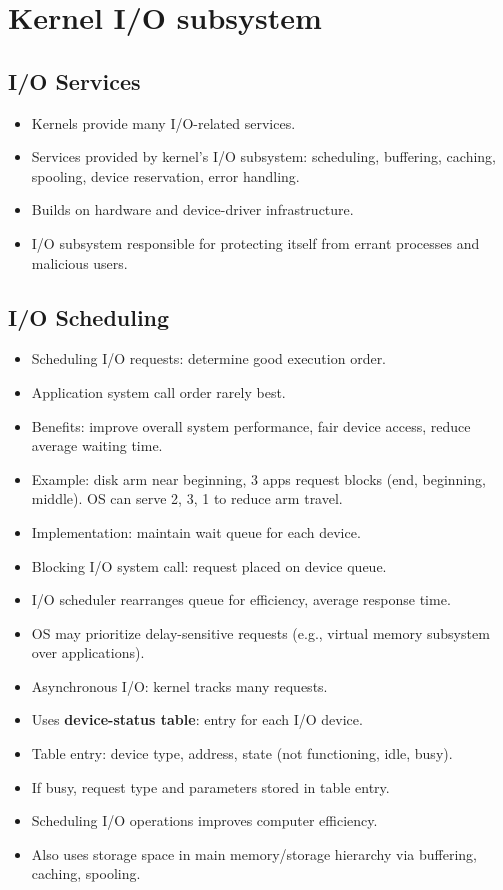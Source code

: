 \section{Kernel I/O subsystem}

\subsection{I/O Services}
\begin{itemize}
    \item Kernels provide many I/O-related services.
    \item Services provided by kernel's I/O subsystem: scheduling, buffering, caching, spooling, device reservation, error handling.
    \item Builds on hardware and device-driver infrastructure.
    \item I/O subsystem responsible for protecting itself from errant processes and malicious users.
\end{itemize}

\subsection{I/O Scheduling}
\begin{itemize}
    \item Scheduling I/O requests: determine good execution order.
    \item Application system call order rarely best.
    \item Benefits: improve overall system performance, fair device access, reduce average waiting time.
    \item Example: disk arm near beginning, 3 apps request blocks (end, beginning, middle). OS can serve 2, 3, 1 to reduce arm travel.
    \item Implementation: maintain wait queue for each device.
    \item Blocking I/O system call: request placed on device queue.
    \item I/O scheduler rearranges queue for efficiency, average response time.
    \item OS may prioritize delay-sensitive requests (e.g., virtual memory subsystem over applications).
    \item Asynchronous I/O: kernel tracks many requests.
    \item Uses \textbf{device-status table}: entry for each I/O device.
    \item Table entry: device type, address, state (not functioning, idle, busy).
    \item If busy, request type and parameters stored in table entry.
    \item Scheduling I/O operations improves computer efficiency.
    \item Also uses storage space in main memory/storage hierarchy via buffering, caching, spooling.
\end{itemize}

